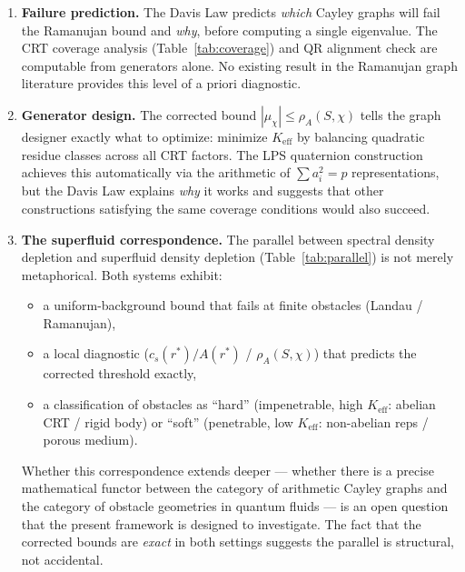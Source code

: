 \documentclass[12pt,reqno]{amsart}
\theoremstyle{plain}
\theoremstyle{definition}
\theoremstyle{remark}
\begin{document}
\begin{enumerate}
  \item \textbf{Failure prediction.}  The Davis Law predicts
    \emph{which} Cayley graphs will fail the Ramanujan bound and
    \emph{why}, before computing a single eigenvalue.  The CRT
    coverage analysis (Table~\ref{tab:coverage}) and QR alignment
    check are computable from generators alone.  No existing result in
    the Ramanujan graph literature provides this level of a priori
    diagnostic.

  \item \textbf{Generator design.}  The corrected bound $|\mu_\chi|
    \leq \rho_A(S,\chi)$ tells the graph designer exactly what to
    optimize: minimize $K_{\mathrm{eff}}$ by balancing quadratic
    residue classes across all CRT factors.  The LPS quaternion
    construction achieves this automatically via the arithmetic of
    $\sum a_i^2 = p$ representations, but the Davis Law explains
    \emph{why} it works and suggests that other constructions
    satisfying the same coverage conditions would also succeed.

  \item \textbf{The superfluid correspondence.}  The parallel between
    spectral density depletion and superfluid density depletion
    (Table~\ref{tab:parallel}) is not merely metaphorical.  Both
    systems exhibit:
    \begin{itemize}[nosep]
      \item a uniform-background bound that fails at finite obstacles
        (Landau / Ramanujan),
      \item a local diagnostic ($c_s(r^*)/A(r^*)$ / $\rho_A(S,\chi)$)
        that predicts the corrected threshold exactly,
      \item a classification of obstacles as ``hard'' (impenetrable,
        high $K_{\mathrm{eff}}$: abelian CRT / rigid body) or ``soft''
        (penetrable, low $K_{\mathrm{eff}}$: non-abelian reps /
        porous medium).
    \end{itemize}
    Whether this correspondence extends deeper --- whether there is a
    precise mathematical functor between the category of arithmetic
    Cayley graphs and the category of obstacle geometries in quantum
    fluids --- is an open question that the present framework is
    designed to investigate.  The fact that the corrected bounds are
    \emph{exact} in both settings suggests the parallel is structural,
    not accidental.


\end{enumerate}
\end{document}
